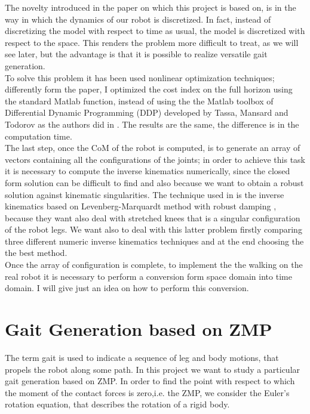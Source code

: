 \documentclass[a4paper]{article}
\begin{document}
The novelty introduced in the paper on which this project is based on, is in the way in which the dynamics of our robot is discretized. In fact, instead of discretizing the model with respect to time as usual, the model is discretized with respect to the space. This renders the problem more difficult to treat, as we will see later, but the advantage is that it is possible to realize versatile gait generation.\\
To solve this problem it has been used nonlinear optimization techniques; differently form the paper, I  optimized the cost index on the full horizon using the standard Matlab function, instead of using the  the Matlab toolbox of Differential Dynamic Programming (DDP) developed by Tassa, Mansard and Todorov \cite{Tassa} as the authors did in \cite{  Kaj1}.  The results are the same, the difference is in the computation time.\\
The last step, once the CoM of the robot is computed, is to generate an array of vectors containing all the configurations of the joints; in order to achieve this task it is necessary to compute the inverse kinematics numerically, since the closed form solution can be difficult to find and also because we want to obtain a robust solution against kinematic singularities. The technique used in \cite{Kaj1} is the inverse kinematics based on Levenberg-Marquardt method with robust damping \cite{LMmethod}, because they want also deal with stretched knees that is a singular configuration of the robot legs. We want also to deal with this latter problem firstly comparing three different numeric inverse kinematics techniques and at the end choosing the the best method.\\
Once the array of configuration is complete, to implement the the walking on the real robot it is necessary to perform a conversion form space domain into time domain. I will give just an idea on how to perform this conversion.  


\section{Gait Generation based on ZMP}


The term gait is used to indicate a sequence of leg and body motions, that propels the robot along some path. In this project we want to study a particular gait generation based on ZMP. In order to find the point with respect to which the moment of the contact forces is zero,i.e. the ZMP, we consider the Euler's rotation equation, that describes the rotation of a rigid body.
\end{document}
